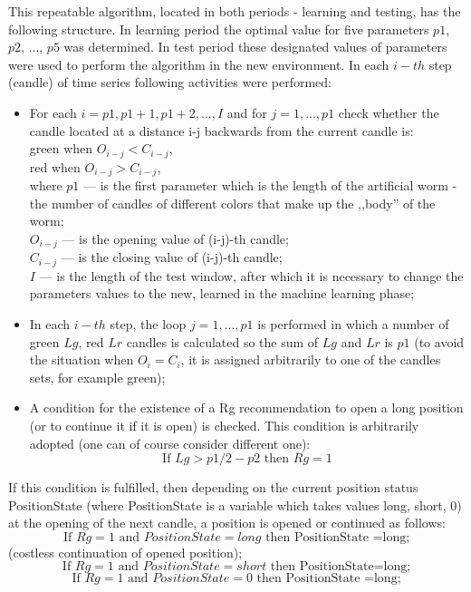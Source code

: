 \documentclass[runningheads,a4paper]{llncs}
\begin{document}
This repeatable algorithm, located in both periods - learning and testing, has the following structure. In learning period the optimal value for five parameters $p1$, $p2$, ..., $p5$ was determined. In test period these designated values of parameters were used to perform the algorithm in the new environment. In each $i-th$ step (candle) of time series following activities were performed:
\begin{itemize}
\item For each $i = p1, p1 +1, p1 +2, ..., I$ and for $j = 1, ..., p1$ check whether the candle located at a distance i-j backwards from the current candle is:\\
green when $O_{i-j} <C_{i-j}$, \\
red when $O_{i-j}> C_{i-j}$, \\
where $p1$ --- is the first parameter which is the length of the artificial worm - the number of candles of different colors that make up the ,,body'' of the worm; \\
$O_{i-j}$ --- is the opening value of (i-j)-th candle;\\ 
$C_{i-j}$ --- is the closing value of (i-j)-th candle; \\
$I$ --- is the length of the test window, after which it is necessary to change the parameters values to the new, learned in the machine learning phase;\\
\item In each $i-th$ step, the loop $j = 1, ..., p1$ is performed in which a number of green $Lg$, red $Lr$ candles is calculated so the sum of $Lg$ and $Lr$ is $p1$ (to avoid the situation when $O_i = C_i$, it is assigned arbitrarily to one of the candles sets, for example green);
\item A condition for the existence of a Rg recommendation to open a long position (or to continue it if it is open) is checked. This condition is arbitrarily adopted (one can of course consider different one): 
\begin{equation}
\text{If } Lg> p1/2-p2 \text{ then } Rg=1
\end{equation}  
                                                     
\end{itemize}
If this condition is fulfilled, then depending on the current position status PositionState (where PositionState is a variable which takes values {long, short, 0}) at the opening of the next candle, a position is opened or continued as follows: 
\begin{equation}
\text{If } Rg=1 \text{ and } PositionState =long \text{ then PositionState =long;}
\end{equation}
(costless continuation of opened position);
\begin{equation}
\text{If } Rg=1 \text{ and } PositionState = short \text{ then PositionState=long;}
\end{equation}
\begin{equation}
\text{If } Rg=1 \text{ and } PositionState =0 \text{ then PositionState =long;}
\end{equation}
\end{document}
